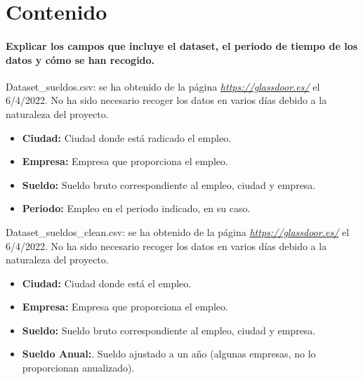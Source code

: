 \documentclass[IB]{PlantillaPACnova_Est}
\begin{document}
\newpage 
\section{Contenido}
\paragraph{Explicar los campos que incluye el dataset, el periodo de tiempo de los datos y cómo se han recogido.\\}
Dataset\_sueldos.csv: se ha obtenido de la página  \textit{\url{https://glassdoor.es/}} el 6/4/2022. No ha sido necesario recoger los datos en varios días debido a la naturaleza del proyecto.
\begin{itemize}
\item \textbf{Ciudad:} Ciudad donde está radicado el empleo.
\item \textbf{Empresa:} Empresa que proporciona el empleo.
\item \textbf{Sueldo:} Sueldo bruto correspondiente al empleo, ciudad y empresa.
\item \textbf{Periodo:} Empleo en el periodo indicado, en su caso.
\end{itemize}

Dataset\_sueldos\_clean.csv: se ha obtenido de la página  \textit{\url{https://glassdoor.es/}} el 6/4/2022. No ha sido necesario recoger los datos en varios días debido a la naturaleza del proyecto.
\begin{itemize}
\item \textbf{Ciudad: } Ciudad donde está el empleo.
\item \textbf{Empresa:} Empresa que proporciona el empleo.
\item \textbf{Sueldo:} Sueldo bruto correspondiente al empleo, ciudad y empresa.
\item \textbf{Sueldo Anual:}. Sueldo ajustado a un año (algunas empresas, no lo proporcionan anualizado).
\end{itemize}
\end{document}

